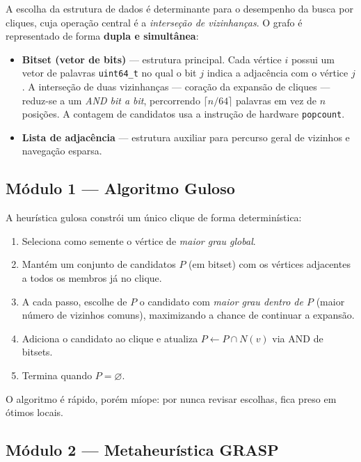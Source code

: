 \documentclass[12pt]{article}
\begin{document}
A escolha da estrutura de dados é determinante para o desempenho da busca por
cliques, cuja operação central é a \emph{interseção de vizinhanças}. O grafo é
representado de forma \textbf{dupla e simultânea}:

\begin{itemize}
  \item \textbf{Bitset (vetor de bits)} --- estrutura principal. Cada vértice
  $i$ possui um vetor de palavras \texttt{uint64\_t} no qual o bit $j$ indica a
  adjacência com o vértice $j$. A interseção de duas vizinhanças --- coração da
  expansão de cliques --- reduz-se a um \emph{AND bit a bit}, percorrendo
  $\lceil n/64 \rceil$ palavras em vez de $n$ posições. A contagem de candidatos
  usa a instrução de hardware \texttt{popcount}.
  \item \textbf{Lista de adjacência} --- estrutura auxiliar para percurso geral
  de vizinhos e navegação esparsa.
\end{itemize}

\subsection{Módulo 1 --- Algoritmo Guloso}

A heurística gulosa constrói um único clique de forma determinística:

\begin{enumerate}
  \item Seleciona como semente o vértice de \emph{maior grau global}.
  \item Mantém um conjunto de candidatos $P$ (em bitset) com os vértices
  adjacentes a todos os membros já no clique.
  \item A cada passo, escolhe de $P$ o candidato com \emph{maior grau dentro de
  $P$} (maior número de vizinhos comuns), maximizando a chance de continuar a
  expansão.
  \item Adiciona o candidato ao clique e atualiza $P \leftarrow P \cap N(v)$ via
  AND de bitsets.
  \item Termina quando $P = \varnothing$.
\end{enumerate}

O algoritmo é rápido, porém míope: por nunca revisar escolhas, fica preso em
ótimos locais.

\subsection{Módulo 2 --- Metaheurística GRASP}
\end{document}
